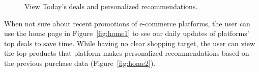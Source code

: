 \begin{figure}[t!]
	\caption{View Today's deals and personalized recommendations.}\vspace{-2ex}
	\label{fig:home}
\end{figure}
When not sure about recent promotions of e-commerce platforms, the user can use the home page in Figure~\ref{fig:home1} to see our daily updates of platforms' top deals to save time. While having no clear shopping target, the user can view the top products that platform makes personalized recommendations based on the previous purchase data (Figure~\ref{fig:home2}).

